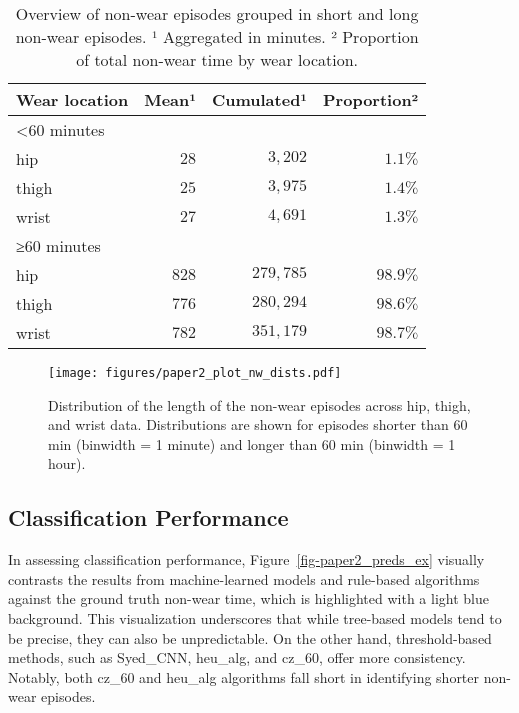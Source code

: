 \documentclass[
  9pt,
]{scrbook}
\begin{document}
\hypertarget{tbl-9}{}
\begin{longtable}{lrrr}
\caption{\label{tbl-9}Overview of non-wear episodes grouped in short and long non-wear
episodes. ¹ Aggregated in minutes. ² Proportion of total non-wear time
by wear location. }\tabularnewline

\toprule
Wear location & Mean¹ & Cumulated¹ & Proportion² \\ 
\midrule
\multicolumn{4}{l}{<60 minutes} \\ 
\midrule
hip & $28$ & $3,202$ & $1.1\%$ \\ 
thigh & $25$ & $3,975$ & $1.4\%$ \\ 
wrist & $27$ & $4,691$ & $1.3\%$ \\ 
\midrule
\multicolumn{4}{l}{≥60 minutes} \\ 
\midrule
hip & $828$ & $279,785$ & $98.9\%$ \\ 
thigh & $776$ & $280,294$ & $98.6\%$ \\ 
wrist & $782$ & $351,179$ & $98.7\%$ \\ 
\bottomrule
\end{longtable}

\endgroup

\begin{figure}

{\centering \texttt{[image: figures/paper2\_plot\_nw\_dists.pdf]}

}

\caption{\label{fig-paper2_nw_dists}Distribution of the length of the
non-wear episodes across hip, thigh, and wrist data. Distributions are
shown for episodes shorter than 60 min (binwidth = 1 minute) and longer
than 60 min (binwidth = 1 hour).}

\end{figure}

\hypertarget{classification-performance}{%
\subsection{Classification
Performance}\label{classification-performance}}

In assessing classification performance,
Figure~\ref{fig-paper2_preds_ex} visually contrasts the results from
machine-learned models and rule-based algorithms against the ground
truth non-wear time, which is highlighted with a light blue background.
This visualization underscores that while tree-based models tend to be
precise, they can also be unpredictable. On the other hand,
threshold-based methods, such as Syed\_CNN, heu\_alg, and cz\_60, offer
more consistency. Notably, both cz\_60 and heu\_alg algorithms fall
short in identifying shorter non-wear episodes.
\end{document}

